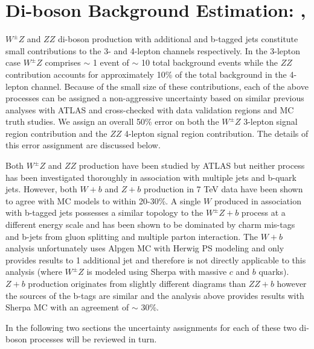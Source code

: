 \section{Di-boson Background Estimation: \WZ,\ZZ }

\label{section:wz}
$W^{\pm}Z$ and $ZZ$ di-boson production with additional and b-tagged jets constitute small contributions to 
the 3- and 4-lepton channels respectively. In the 3-lepton case $W^{\pm}Z$ comprises $\sim$ 1 event of $\sim$ 10 
total background events while the $ZZ$ contribution accounts for approximately 10\% of the total background in the 
4-lepton channel. Because of the small size of these contributions, each of the above processes can be assigned a 
non-aggressive uncertainty based on similar previous analyses with ATLAS and cross-checked with data validation 
regions and MC truth studies. We assign an overall 50\% error on both the $W^{\pm}Z$ 3-lepton signal region 
contribution and the $ZZ$ 4-lepton signal region contribution. The details of this error assignment are discussed below.
 
Both $W^{\pm}Z$ and $ZZ$ production have been studied by ATLAS \cite{WZAtlas}\cite{ZZAtlas} but neither process
has been investigated thoroughly in association with multiple jets and b-quark jets. However, both $W+b$ \cite{WbAtlas} 
and $Z+b$ \cite{ZbAtlas} production in 7 TeV data have been shown to agree with MC models to within 20-30\%. 
A single $W$ produced in association with b-tagged jets possesses a similar topology to the $W^{\pm}Z+b$ 
process at a different energy scale and has been shown to be dominated by charm mis-tags and b-jets from gluon splitting 
and multiple parton interaction. The $W+b$ analysis unfortunately uses Alpgen MC with Herwig PS modeling and only provides
results to 1 additional jet and therefore is not directly applicable to this \tth analysis (where $W^{\pm}Z$ is modeled 
using Sherpa with massive $c$ and $b$ quarks). $Z+b$ production originates from slightly different diagrams than $ZZ+b$ 
however the sources of the b-tags are similar and the analysis above provides results with Sherpa MC with an agreement 
of $\sim$ 30\%.
 
In the following two sections the uncertainty assignments for each of these two di-boson processes will be reviewed in turn. 

